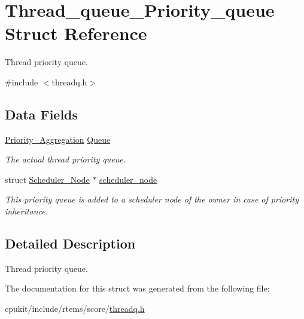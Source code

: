 \hypertarget{structThread__queue__Priority__queue}{}\section{Thread\+\_\+queue\+\_\+\+Priority\+\_\+queue Struct Reference}
\label{structThread__queue__Priority__queue}


Thread priority queue.  




{\ttfamily \#include $<$threadq.\+h$>$}

\subsection*{Data Fields}
\begin{DoxyCompactItemize}
\item 
\mbox{\label{structThread__queue__Priority__queue_a7867cd6f3cd48547e9bf0613c23a97bb}} 
\mbox{\hyperlink{structPriority__Aggregation}{Priority\+\_\+\+Aggregation}} \mbox{\hyperlink{structThread__queue__Priority__queue_a7867cd6f3cd48547e9bf0613c23a97bb}{Queue}}
\begin{DoxyCompactList}\small\item\em The actual thread priority queue. \end{DoxyCompactList}\item 
\mbox{\label{structThread__queue__Priority__queue_a3946dc7d153b810723ba94b453c862ce}} 
struct \mbox{\hyperlink{structScheduler__Node}{Scheduler\+\_\+\+Node}} $\ast$ \mbox{\hyperlink{structThread__queue__Priority__queue_a3946dc7d153b810723ba94b453c862ce}{scheduler\+\_\+node}}
\begin{DoxyCompactList}\small\item\em This priority queue is added to a scheduler node of the owner in case of priority inheritance. \end{DoxyCompactList}\end{DoxyCompactItemize}


\subsection{Detailed Description}
Thread priority queue. 

The documentation for this struct was generated from the following file\+:\begin{DoxyCompactItemize}
\item 
cpukit/include/rtems/score/\mbox{\hyperlink{threadq_8h}{threadq.\+h}}\end{DoxyCompactItemize}
